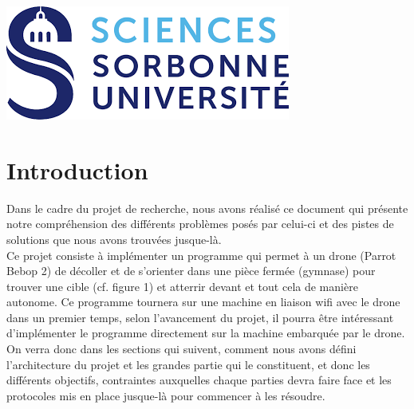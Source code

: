 \documentclass[12pt]{article}
\begin{document}
\begin{titlepage}




\includegraphics[scale=0.5]{logo.png}\\[1cm] %
 

\vfill %

\end{titlepage}






\renewcommand{\contentsname}{Sommaire}
\tableofcontents
\newpage

\section{Introduction}

Dans le cadre du projet de recherche, nous avons réalisé ce document qui présente notre compréhension des différents problèmes posés par celui-ci et des pistes de solutions que nous avons trouvées jusque-là. \\
Ce projet consiste à implémenter un programme qui permet à un drone (Parrot Bebop 2) de décoller et de s'orienter dans une pièce fermée (gymnase) pour trouver une cible (cf. figure 1) et atterrir devant et tout cela de manière autonome. Ce programme tournera sur une machine en liaison wifi avec le drone dans un premier temps, selon l'avancement du projet, il pourra être intéressant d'implémenter le programme directement sur la machine embarquée par le drone. \\On verra donc dans les sections qui suivent, comment nous avons défini l'architecture du projet et les grandes partie qui le constituent, et donc les différents objectifs, contraintes auxquelles chaque parties devra faire face et les protocoles mis en place jusque-là pour commencer à les résoudre.
\end{document}
